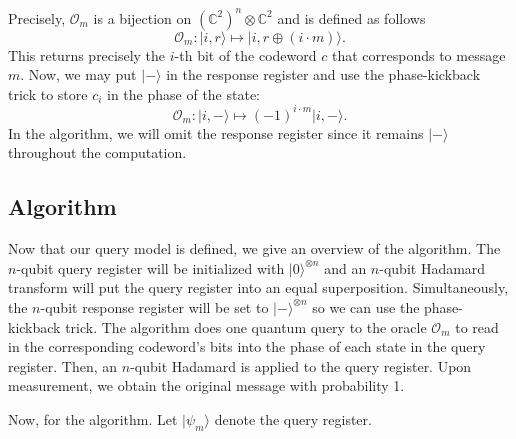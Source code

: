 \documentclass[12pt,twoside]{reedthesis}
\theoremstyle{definition}
\newcommand{\C}{\mathbb{C}}
\newcommand{\ket}[1]{\ensuremath{\lvert #1\rangle}\xspace}
\newcommand{\Hminus}{\ensuremath{\lvert- \rangle}\xspace}
\begin{document}
Precisely, $\mathcal{O}_m$ is a bijection on $(\C^2)^n \otimes \C^2$ and is defined as follows
\begin{equation*}
\mathcal{O}_m: \ket{i, r} \longmapsto \ket{i, r \oplus (i\cdot m)}.
\end{equation*} 
This returns precisely the $i$-th bit of the codeword $c$ that corresponds to message $m$. Now, we may put $\Hminus$ in the response register and use the phase-kickback trick to store $c_i$ in the phase of the state:
\begin{equation*}
\mathcal{O}_m: \ket{i, -} \longmapsto (-1)^{i \cdot m}\ket{i,-}.
\end{equation*}
In the algorithm, we will omit the response register since it remains $\Hminus$ throughout the computation.
\subsection{Algorithm}

Now that our query model is defined, we give an overview of the algorithm. The $n$-qubit query register will be initialized with $\ket{0}^{\otimes n}$ and an $n$-qubit Hadamard transform will put the query register into an equal superposition. Simultaneously, the $n$-qubit response register will be set to $\Hminus^{\otimes n}$ so we can use the phase-kickback trick. The algorithm does one quantum query to the oracle $\mathcal{O}_m$ to read in the corresponding codeword's bits into the phase of each state in the query register. Then, an $n$-qubit Hadamard is applied to the query register. Upon measurement, we obtain the original message with probability 1.

Now, for the algorithm. Let $\ket{\psi_m}$ denote the query register.
\end{document}
